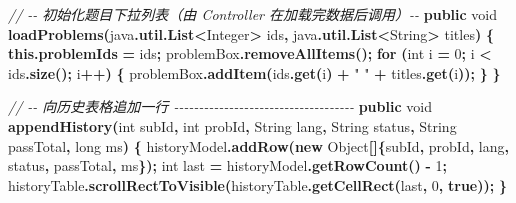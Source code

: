 \documentclass[
  11pt,
]{ctexart}
\newenvironment{Shaded}{\begin{snugshade}}{\end{snugshade}}
\newcommand{\BuiltInTok}[1]{#1}
\newcommand{\CommentTok}[1]{\textcolor[rgb]{0.56,0.35,0.01}{\textit{#1}}}
\newcommand{\ControlFlowTok}[1]{\textcolor[rgb]{0.13,0.29,0.53}{\textbf{#1}}}
\newcommand{\DataTypeTok}[1]{\textcolor[rgb]{0.13,0.29,0.53}{#1}}
\newcommand{\DecValTok}[1]{\textcolor[rgb]{0.00,0.00,0.81}{#1}}
\newcommand{\FunctionTok}[1]{\textcolor[rgb]{0.13,0.29,0.53}{\textbf{#1}}}
\newcommand{\KeywordTok}[1]{\textcolor[rgb]{0.13,0.29,0.53}{\textbf{#1}}}
\newcommand{\NormalTok}[1]{#1}
\newcommand{\OperatorTok}[1]{\textcolor[rgb]{0.81,0.36,0.00}{\textbf{#1}}}
\newcommand{\StringTok}[1]{\textcolor[rgb]{0.31,0.60,0.02}{#1}}
\begin{document}
\begin{Shaded}
\begin{Highlighting}[]
    \CommentTok{// {-}{-} 初始化题目下拉列表（由 Controller 在加载完数据后调用）{-}{-}}
    \KeywordTok{public} \DataTypeTok{void} \FunctionTok{loadProblems}\OperatorTok{(}\NormalTok{java}\OperatorTok{.}\FunctionTok{util}\OperatorTok{.}\FunctionTok{List}\OperatorTok{\textless{}}\BuiltInTok{Integer}\OperatorTok{\textgreater{}}\NormalTok{ ids}\OperatorTok{,}\NormalTok{ java}\OperatorTok{.}\FunctionTok{util}\OperatorTok{.}\FunctionTok{List}\OperatorTok{\textless{}}\BuiltInTok{String}\OperatorTok{\textgreater{}}\NormalTok{ titles}\OperatorTok{)} \OperatorTok{\{}
        \KeywordTok{this}\OperatorTok{.}\FunctionTok{problemIds} \OperatorTok{=}\NormalTok{ ids}\OperatorTok{;}
\NormalTok{        problemBox}\OperatorTok{.}\FunctionTok{removeAllItems}\OperatorTok{();}
        \ControlFlowTok{for} \OperatorTok{(}\DataTypeTok{int}\NormalTok{ i }\OperatorTok{=} \DecValTok{0}\OperatorTok{;}\NormalTok{ i }\OperatorTok{\textless{}}\NormalTok{ ids}\OperatorTok{.}\FunctionTok{size}\OperatorTok{();}\NormalTok{ i}\OperatorTok{++)} \OperatorTok{\{}
\NormalTok{            problemBox}\OperatorTok{.}\FunctionTok{addItem}\OperatorTok{(}\NormalTok{ids}\OperatorTok{.}\FunctionTok{get}\OperatorTok{(}\NormalTok{i}\OperatorTok{)} \OperatorTok{+} \StringTok{" "} \OperatorTok{+}\NormalTok{ titles}\OperatorTok{.}\FunctionTok{get}\OperatorTok{(}\NormalTok{i}\OperatorTok{));}
        \OperatorTok{\}}
    \OperatorTok{\}}

    \CommentTok{// {-}{-} 向历史表格追加一行 {-}{-}{-}{-}{-}{-}{-}{-}{-}{-}{-}{-}{-}{-}{-}{-}{-}{-}{-}{-}{-}{-}{-}{-}{-}{-}{-}{-}{-}{-}{-}{-}{-}{-}{-}{-}}
    \KeywordTok{public} \DataTypeTok{void} \FunctionTok{appendHistory}\OperatorTok{(}\DataTypeTok{int}\NormalTok{ subId}\OperatorTok{,} \DataTypeTok{int}\NormalTok{ probId}\OperatorTok{,} \BuiltInTok{String}\NormalTok{ lang}\OperatorTok{,}
                              \BuiltInTok{String}\NormalTok{ status}\OperatorTok{,} \BuiltInTok{String}\NormalTok{ passTotal}\OperatorTok{,} \DataTypeTok{long}\NormalTok{ ms}\OperatorTok{)} \OperatorTok{\{}
\NormalTok{        historyModel}\OperatorTok{.}\FunctionTok{addRow}\OperatorTok{(}\KeywordTok{new} \BuiltInTok{Object}\OperatorTok{[]\{}\NormalTok{subId}\OperatorTok{,}\NormalTok{ probId}\OperatorTok{,}\NormalTok{ lang}\OperatorTok{,}\NormalTok{ status}\OperatorTok{,}\NormalTok{ passTotal}\OperatorTok{,}\NormalTok{ ms}\OperatorTok{\});}
        \DataTypeTok{int}\NormalTok{ last }\OperatorTok{=}\NormalTok{ historyModel}\OperatorTok{.}\FunctionTok{getRowCount}\OperatorTok{()} \OperatorTok{{-}} \DecValTok{1}\OperatorTok{;}
\NormalTok{        historyTable}\OperatorTok{.}\FunctionTok{scrollRectToVisible}\OperatorTok{(}\NormalTok{historyTable}\OperatorTok{.}\FunctionTok{getCellRect}\OperatorTok{(}\NormalTok{last}\OperatorTok{,} \DecValTok{0}\OperatorTok{,} \KeywordTok{true}\OperatorTok{));}
    \OperatorTok{\}}


\end{Highlighting}
\end{Shaded}
\end{document}
